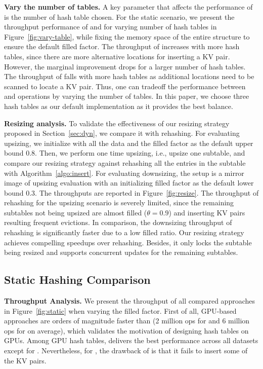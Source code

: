 \vspace{1mm}
\noindent\textbf{Vary the number of tables.}
A key parameter that affects the performance of \voter is the number of hash table chosen. For the static scenario, we present the throughput performance of  and  for varying number of hash tables in Figure~\ref{fig:vary-table}, while fixing the memory space of the entire structure to ensure the default filled factor. 
The throughput of  increases with more hash tables, since there are more alternative locations for inserting a KV pair. However, the marginal improvement drops for a larger number of hash tables. The throughput of  falls with more hash tables as additional locations need to be scanned to locate a KV pair. Thus, one can tradeoff the performance between  and  operations by varying the number of tables. In this paper, we choose three hash tables as our default implementation as it provides the best balance. 

\vspace{1mm}
\noindent\textbf{Resizing analysis.}
To validate the effectiveness of our resizing strategy proposed in Section~\ref{sec:dyn}, we compare it with rehashing. 
For evaluating upsizing, we initialize \voter with all the data and the filled factor as the default upper bound $0.8$. Then, we perform one time upsizing, i.e., upsize one subtable, and compare our resizing strategy against rehashing all the entries in the subtable with Algorithm~\ref{algo:insert}.
For evaluating downsizing, the setup is a mirror image of upsizing evaluation with an initializing filled factor as the default lower bound $0.3$. 
The throughputs are reported in Figure~\ref{fig:resize}. 
The throughput of rehashing for the upsizing scenario is severely limited, since the remaining subtables not being upsized are almost filled ($\theta=0.9$) and inserting KV pairs resulting frequent evictions.  
In comparison, the downsizing throughput of rehashing is significantly faster due to a low filled ratio.
Our resizing strategy achieves compelling speedups over rehashing. Besides, it only locks the subtable being resized and supports concurrent updates for the remaining subtables. 


\subsection{Static Hashing Comparison}\label{sec:exp:static}

\vspace{1mm}\noindent\textbf{Throughput Analysis.} We present the throughput of all compared approaches in Figure~\ref{fig:static} when varying the filled factor. 
First of all, GPU-based approaches are orders of magnitude faster than \google (2  million ops for  and 6 million ops for  on average), which validates the motivation of designing hash tables on GPUs. 
Among GPU hash tables, \megakv delivers the best performance across all datasets except for \dsali. Nevertheless, for , the drawback of \megakv is that it fails to insert some of the KV pairs. 


